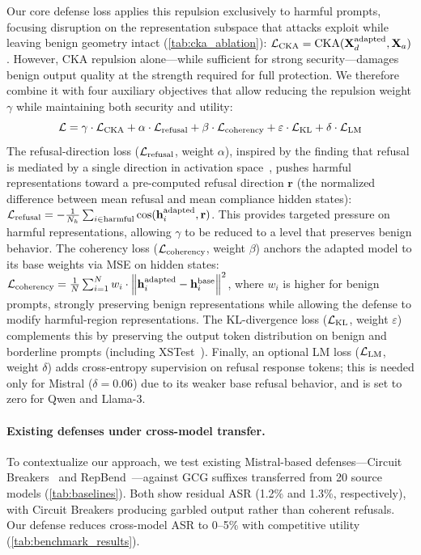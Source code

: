 Our core defense loss applies this repulsion exclusively to harmful prompts, focusing disruption on the representation subspace that attacks exploit while leaving benign geometry intact (\cref{tab:cka_ablation}): $\mathcal{L}_{\text{CKA}} = \text{CKA}(\mathbf{X}_d^{\text{adapted}}, \mathbf{X}_a)$. However, CKA repulsion alone---while sufficient for strong security---damages benign output quality at the strength required for full protection. We therefore combine it with four auxiliary objectives that allow reducing the repulsion weight $\gamma$ while maintaining both security and utility:
\begin{equation}
    \mathcal{L} = \gamma \cdot \mathcal{L}_{\text{CKA}} + \alpha \cdot \mathcal{L}_{\text{refusal}} + \beta \cdot \mathcal{L}_{\text{coherency}} + \varepsilon \cdot \mathcal{L}_{\text{KL}} + \delta \cdot \mathcal{L}_{\text{LM}}
\end{equation}
The refusal-direction loss ($\mathcal{L}_{\text{refusal}}$, weight $\alpha$), inspired by the finding that refusal is mediated by a single direction in activation space~\citep{repeng, arditi2024refusal, li2023iti}, pushes harmful representations toward a pre-computed refusal direction $\mathbf{r}$ (the normalized difference between mean refusal and mean compliance hidden states): $\mathcal{L}_{\text{refusal}} = -\frac{1}{N_h} \sum_{i \in \text{harmful}} \cos(\mathbf{h}_i^{\text{adapted}}, \mathbf{r})$. This provides targeted pressure on harmful representations, allowing $\gamma$ to be reduced to a level that preserves benign behavior. The coherency loss ($\mathcal{L}_{\text{coherency}}$, weight $\beta$) anchors the adapted model to its base weights via MSE on hidden states: $\mathcal{L}_{\text{coherency}} = \frac{1}{N} \sum_{i=1}^{N} w_i \cdot \left\| \mathbf{h}_i^{\text{adapted}} - \mathbf{h}_i^{\text{base}} \right\|^2$, where $w_i$ is higher for benign prompts, strongly preserving benign representations while allowing the defense to modify harmful-region representations. The KL-divergence loss ($\mathcal{L}_{\text{KL}}$, weight $\varepsilon$) complements this by preserving the output token distribution on benign and borderline prompts (including XSTest~\citep{xstest}). Finally, an optional LM loss ($\mathcal{L}_{\text{LM}}$, weight $\delta$) adds cross-entropy supervision on refusal response tokens; this is needed only for Mistral ($\delta = 0.06$) due to its weaker base refusal behavior, and is set to zero for Qwen and Llama-3.

\paragraph{Existing defenses under cross-model transfer.}
To contextualize our approach, we test existing Mistral-based defenses---Circuit Breakers~\citep{zou2024circuitbreakers} and RepBend~\citep{repbend}---against GCG suffixes transferred from 20 source models (\cref{tab:baselines}). Both show residual ASR (1.2\% and 1.3\%, respectively), with Circuit Breakers producing garbled output rather than coherent refusals. Our defense reduces cross-model ASR to 0--5\% with competitive utility (\cref{tab:benchmark_results}).

